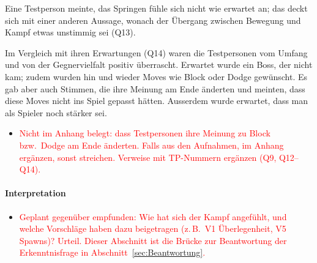 \documentclass[../Main.tex]{subfiles}
\begin{document}
Eine Testperson meinte, das Springen fühle sich nicht wie erwartet an; das deckt sich mit einer anderen Aussage, wonach der Übergang zwischen Bewegung und Kampf etwas unstimmig sei (Q13).

Im Vergleich mit ihren Erwartungen (Q14) waren die Testpersonen vom Umfang und von der Gegnervielfalt positiv überrascht. Erwartet wurde ein Boss, der nicht kam; zudem wurden hin und wieder Moves wie Block oder Dodge gewünscht. Es gab aber auch Stimmen, die ihre Meinung am Ende änderten und meinten, dass diese Moves nicht ins Spiel gepasst hätten. Ausserdem wurde erwartet, dass man als Spieler noch stärker sei.

\begin{itemize}[leftmargin=1.5cm]
    \item \textcolor{red}{Nicht im Anhang belegt: dass Testpersonen ihre Meinung zu Block bzw.\ Dodge am Ende änderten. Falls aus den Aufnahmen, im Anhang ergänzen, sonst streichen. Verweise mit TP-Nummern ergänzen (Q9, Q12--Q14).}
\end{itemize}

\paragraph{Interpretation}
\begin{itemize}[leftmargin=1.5cm]
    \item \textcolor{red}{Geplant gegenüber empfunden: Wie hat sich der Kampf angefühlt, und welche Vorschläge haben dazu beigetragen (z.\,B.\ V1 Überlegenheit, V5 Spawns)? Urteil. Dieser Abschnitt ist die Brücke zur Beantwortung der Erkenntnisfrage in Abschnitt~\ref{sec:Beantwortung}.}
\end{itemize}
\end{document}
